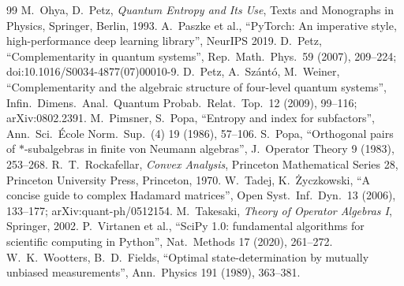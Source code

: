 \documentclass[11pt]{article}
\theoremstyle{plain}
\theoremstyle{definition}
\theoremstyle{remark}
\begin{document}
{\begin{thebibliography}{99}
 M.~Ohya, D.~Petz, \emph{Quantum Entropy and Its Use}, Texts and Monographs in Physics, Springer,
  Berlin, 1993.
 A.~Paszke et al., ``PyTorch: An imperative style, high-performance deep learning
  library'', NeurIPS 2019.
 D.~Petz, ``Complementarity in quantum systems'', Rep.\ Math.\ Phys.\ 59 (2007), 209--224;
  doi:10.1016/S0034-4877(07)00010-9.
 D.~Petz, A.~Sz\'ant\'o, M.~Weiner, ``Complementarity and the algebraic structure of four-level
  quantum systems'', Infin.\ Dimens.\ Anal.\ Quantum Probab.\ Relat.\ Top.\ 12 (2009), 99--116; arXiv:0802.2391.
 M.~Pimsner, S.~Popa, ``Entropy and index for subfactors'', Ann.\ Sci.\ \'Ecole Norm.\ Sup.\ (4)
  19 (1986), 57--106.
 S.~Popa, ``Orthogonal pairs of $*$-subalgebras in finite von Neumann algebras'', J.\ Operator Theory
  9 (1983), 253--268.
 R.~T.~Rockafellar, \emph{Convex Analysis}, Princeton Mathematical Series 28, Princeton
  University Press, Princeton, 1970.
 W.~Tadej, K.~\.Zyczkowski, ``A concise guide to complex Hadamard matrices'', Open Syst.\ Inf.\
  Dyn.\ 13 (2006), 133--177; arXiv:quant-ph/0512154.
 M.~Takesaki, \emph{Theory of Operator Algebras I}, Springer, 2002.
\bibitem{virtanen2020} P.~Virtanen et al., ``SciPy 1.0: fundamental algorithms for scientific computing in Python'',
  Nat.\ Methods 17 (2020), 261--272.
 W.~K.~Wootters, B.~D.~Fields, ``Optimal state-determination by mutually unbiased
  measurements'', Ann.\ Physics 191 (1989), 363--381.
\end{thebibliography}
}
\end{document}
